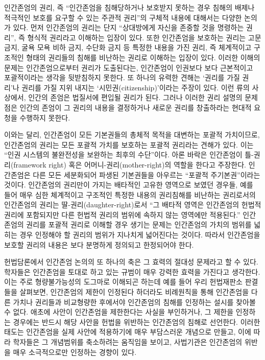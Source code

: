 인간존엄의 권리, 즉 ``인간존엄을 침해당하거나 보호받지 못하는 경우 침해의 배제나 적극적인 보호를 요구할 수 있는 주관적 권리''의 구체적 내용에 대해서는 다양한 논의가 있다. 먼저 인간존엄의 권리는 단지 ``상대방에게 자신을 존중할 것을 명령하는 권리'', 즉 형식적 권리라고 이해하는 입장이 있다. 또한 인간존엄을 보호하는 권리는 고문 금지, 굴욕 모욕 비하 금지, 수단화 금지 등 특정한 내용을 가진 권리, 즉 체계적이고 구조적인 형태의 권리들의 침해를 비난하는 권리로 이해하는 입장이 있다. 이러한 이해의 문제는 인간존엄으로부터 권리가 도출된다는, 인간존엄이 인권보다 보다 근본적이고 포괄적이라는 생각을 뒷받침하지 못한다. 또 하나의 유력한 견해는 `권리를 가질 권리'나 권리를 가질 지위 내지는 `시민권(citizenship)'이라는 주장이 있다. 이런 류의 사상에서, 인간의 존엄은 법질서에 편입될 권리가 된다. 그러나 이러한 권리 설명의 문제점은 인간의 존엄이 그 권리의 내용을 결정하거나 새로운 권리를 창출하라는 현대적 요청을 수행하지 못한다.

이와는 달리, 인간존엄이 모든 기본권들의 총체적 목적을 대변하는 포괄적 가치이므로, 인간존엄의 권리는 모든 포괄적 가치를 보호하는 포괄적 권리라는 견해가 있다. 이는 ``인권 시스템의 불완전성을 보완하는 최후의 수단''이다. 아론 바락은 인간존엄이 틀-권리(framework right) 혹은 어머니-권리(mother-right)의 역할을 한다고 주장한다. 인간존엄은 다른 모든 세분화되어 파생된 기본권들을 아우르는 ``포괄적 주기본권''이라는 것이다. 인간존엄의 권리만이 가지는 배타적인 고유한 영역으로 보였던 경우들, 예를 들어 매우 심한 체계적이고 구조적인 특정한 내용의 권리침해를 비난하는 권리로서의 인간존엄의 권리는 딸-권리(daughter-right)로서 ``그 배타적 영역은 인간존엄의 헌법적 권리에 포함되지만 다른 헌법적 권리의 범위에 속하지 않는 영역에만 적용된다.'' 인간존엄의 권리를 포괄적 권리로 이해할 경우 생기는 문제는 인간존엄의 가치의 범위를 넓히는 경우 인정해야 할 권리의 범위가 지나치게 넓어진다는 것이다. 따라서 인간존엄을 보호할 권리의 내용은 보다 분명하게 정의되고 한정되어야 한다.

헌법담론에서 인간존엄 논의의 또 하나의 축은 그 효력의 절대성 문제라고 할 수 있다.학자들은 인간존엄을 토대로 하고 있는 규범이 매우 강력한 효력을 가진다고 생각한다. 이는 주로 형량불가능성의 도그마로 이해되곤 하는데 예를 들어 우리 헌법재판소 판결들을 살펴보면, 인간존엄의 제한이 인정된다 하더라도 비례원칙을 통해 인간존엄을 다른 가치나 권리들과 비교형량한 후에서야 인간존엄의 침해를 인정하는 설시를 찾아볼 수 없다. 애초에 사안이 인간존엄을 제한한다는 사실을 부인하거나, 그 제한을 인정하는 경우에는 반드시 해당 사안을 헌법을 위반하는 인간존엄의 침해로 선언한다. 이러한 태도는 인간존엄을 실제 사안에 적용하기에 매우 부담스러운 개념으로 만들고, 이에 따라 학자들은 그 개념범위를 축소하려는 움직임을 보이고, 사법기관은 인간존엄의 위반을 매우 소극적으로만 인정하는 경향이 있다.

